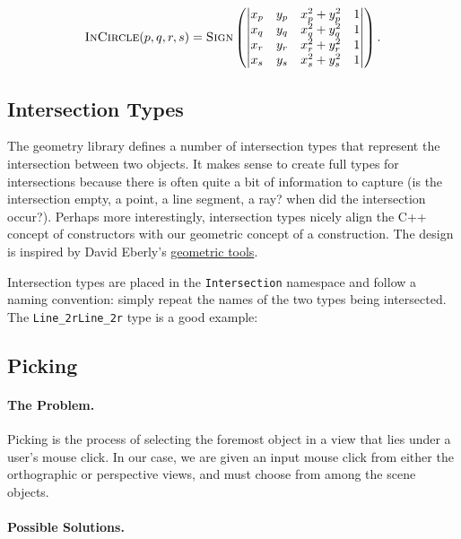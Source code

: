 \[ 
\textsc{InCircle}(p, q, r, s) = \textsc{Sign}\left(
\begin{vmatrix}
	x_p & y_p & x_p^2 + y_p^2 & 1 \\
    x_q & y_q & x_q^2 + y_q^2 & 1\\
    x_r & y_r & x_r^2 + y_r^2 & 1\\
    x_s & y_s & x_s^2 + y_s^2 & 1\\
\end{vmatrix}
\right).
\]


\subsection{Intersection Types}\label{appdx:intersection-types}

The geometry library defines a number of intersection types that represent the
intersection between two objects. It makes sense to create full types for
intersections because there is often quite a bit of information to capture (is
the intersection empty, a point, a line segment, a ray? when did the
intersection occur?). Perhaps more interestingly, intersection types nicely
align the C++ concept of constructors with our geometric concept of a
construction. The design is inspired by David Eberly's
\href{http://www.geometrictools.com/Source/Intersection2D.html}{geometric tools}.

Intersection types are placed in the \texttt{Intersection} namespace and follow
a naming convention: simply repeat the names of the two types being intersected.
The \texttt{Line\_2rLine\_2r} type is a good example:

\subsection{Picking}\label{appdx:picking}

\paragraph{The Problem.} Picking is the process of selecting the foremost object
in a view that lies under a user's mouse click. In our case, we are given an
input mouse click from either the orthographic or perspective views, and must
choose from among the scene objects.

\paragraph{Possible Solutions.}

